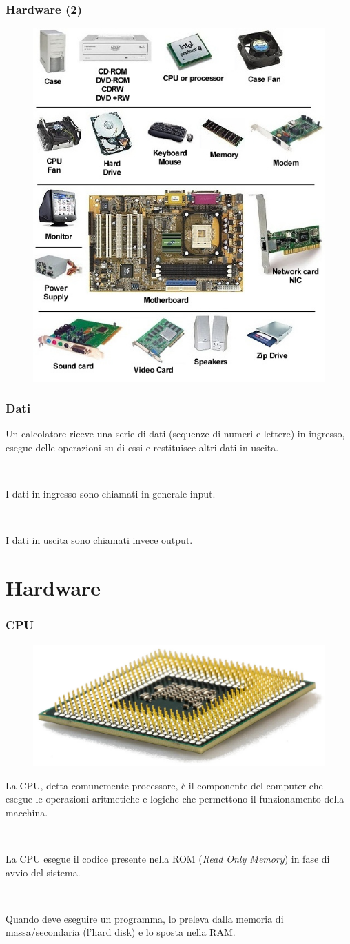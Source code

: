 \documentclass[handout]{beamer}
\begin{document}
\begin{frame}
\frametitle{Hardware (2)}
\begin{figure}
  \includegraphics[width=.5\columnwidth]{img/hardware2.jpg}
\end{figure}
\end{frame}


\begin{frame}
\frametitle{Dati}
Un calcolatore riceve una serie di dati (sequenze di numeri e lettere) in ingresso, \alert<1>{esegue delle operazioni} su di essi e restituisce altri dati in uscita.\pause

~

I dati in ingresso sono chiamati in generale \alert<2>{input}.\pause

~

I dati in uscita sono chiamati invece \alert<3>{output}.
\end{frame}

\section{Hardware}


\begin{frame}
\frametitle{CPU}
\begin{figure}
  \includegraphics[width=.4\columnwidth]{img/cpu.jpg}
\end{figure}
La CPU, detta comunemente \alert<1>{processore}, è il componente del computer che esegue le operazioni aritmetiche e logiche che permettono il funzionamento della macchina.\pause

~

La CPU esegue il codice presente nella ROM (\emph{Read Only Memory}) in fase di avvio del sistema.\pause

~

Quando deve eseguire un programma, lo preleva dalla memoria di massa/secondaria (l'hard disk) e lo sposta nella RAM.
\end{frame}
\end{document}
